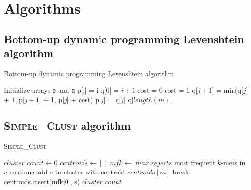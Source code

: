 \section{Algorithms}

\subsection{Bottom-up dynamic programming Levenshtein algorithm}
\label{app:levenshtein_algorithm}

\begin{algorithm}
  \caption{Bottom-up dynamic programming Levenshtein algorithm}
  \label{alg:levenshtein}
  \begin{algorithmic}[1]
    \Statex
      \State Initialize arrays \texttt{p} and \texttt{q}
        \State p[i] = i
      \EndFor
        \State q[$0$] = $i+1$
              \State cost = 0
            \Else
              \State cost = 1
            \EndIf
            \State q[$j+1$] = min(q[$j$] + $1$, p[$j+1$] + 1,          
            p[$j$] + cost)
        \EndFor
            \State p[$j$] = q[$j$]
        \EndFor
      \EndFor
    \State \Return q[$length(m)$]
    \EndFunction
  \end{algorithmic}
\end{algorithm}

\subsection{\textsc{Simple\_Clust} algorithm}
\label{app:simple_clust}

\begin{algorithm}
  \caption{\textsc{Simple\_Clust}}
  \label{alg:simple_clust}
  \begin{algorithmic}[1]
    \Statex
      \State $cluster\_count \gets 0$
      \State $centroids \gets []$ 
        \State $mfk \gets$ $max\_rejects$ most frequent $k$-mers in $s$
            \State continue
            \State add $s$ to cluster with centroid $centroids[m]$
            \State break
          \EndIf
        \EndFor
          \State centroids.insert(mfk[0], s)
        \EndIf
      \EndFor
      \State \Return $cluster\_count$
    \EndFunction
  \end{algorithmic}
\end{algorithm}
